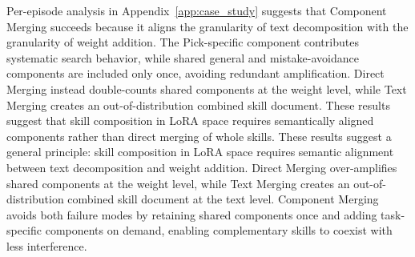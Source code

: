 \documentclass{llmxive}
\begin{document}
Per-episode analysis in Appendix~\ref{app:case_study} suggests that Component Merging succeeds because it aligns the granularity of text decomposition with the granularity of weight addition. The Pick-specific component contributes systematic search behavior, while shared general and mistake-avoidance components are included only once, avoiding redundant amplification. Direct Merging instead double-counts shared components at the weight level, while Text Merging creates an out-of-distribution combined skill document. These results suggest that skill composition in LoRA space requires semantically aligned components rather than direct merging of whole skills. These results suggest a general principle: skill composition in LoRA space requires semantic alignment between text decomposition and weight addition. Direct Merging over-amplifies shared components at the weight level, while Text Merging creates an out-of-distribution combined skill document at the text level. Component Merging avoids both failure modes by retaining shared components once and adding task-specific components on demand, enabling complementary skills to coexist with less interference.
 
\end{document}
